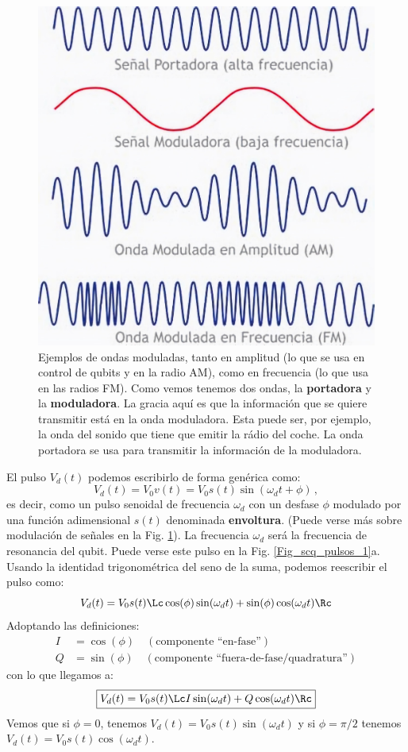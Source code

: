 	\begin{figure}[t]
	\centering 
	\includegraphics[width=0.4\linewidth]{Figuras/Fig_scq_modulacion.jpg}
	\caption{Ejemplos de ondas moduladas, tanto en amplitud (lo que se usa en control de qubits y en la radio AM), como en frecuencia (lo que usa en las radios FM). Como vemos tenemos dos ondas, la \textbf{portadora} y la \textbf{moduladora}. La gracia aquí es que la información que se quiere transmitir está en la onda moduladora. Esta puede ser, por ejemplo, la onda del sonido que tiene que emitir la rádio del coche. La onda portadora se usa para transmitir la información de la moduladora.}
	\label{Fig_scq_modulacion}
	\end{figure}

El pulso $V_d(t)$ podemos escribirlo de forma genérica como:
\begin{equation} \label{eq_scq_Vd_1}
V_d(t) = V_0 v(t) = V_0 s(t) \sin(\omega_d t + \phi) \, ,
\end{equation}
es decir, como un pulso senoidal de frecuencia $\omega_d$ con un desfase $\phi$ modulado por una función adimensional $s(t)$ denominada \textbf{envoltura}. (Puede verse más sobre modulación de señales en la Fig. \ref{Fig_scq_modulacion}). La frecuencia $\omega_d$ será la frecuencia de resonancia del qubit. Puede verse este pulso en la Fig. \ref{Fig_scq_pulsos_1}a. Usando la identidad trigonométrica del seno de la suma, podemos reescribir el pulso como:
	\begin{equation}
	V_d(t) = V_0 s(t) \Lc \cos(\phi) \sin(\omega_d t) + \sin(\phi) \cos (\omega_d t) \Rc
	\end{equation}
Adoptando las definiciones:
\begin{equation} 
\begin{aligned}
I & = \cos (\phi) \quad (\text{componente ``en-fase''}) \\
Q & = \sin (\phi) \quad (\text{componente ``fuera-de-fase/quadratura''})
\end{aligned}
\end{equation}
con lo que llegamos a:
	\begin{equation} \label{eq_scq_Vd_2}
	\boxed{V_d(t) = V_0 s(t) \Lc I \sin(\omega_d t) + Q \cos (\omega_d t) \Rc}
	\end{equation}
Vemos que si $\phi = 0$, tenemos $V_d(t) = V_0 s(t) \sin(\omega_d t)$ y si $\phi = \pi/2$ tenemos $V_d(t) = V_0 s(t) \cos(\omega_d t)$. 




